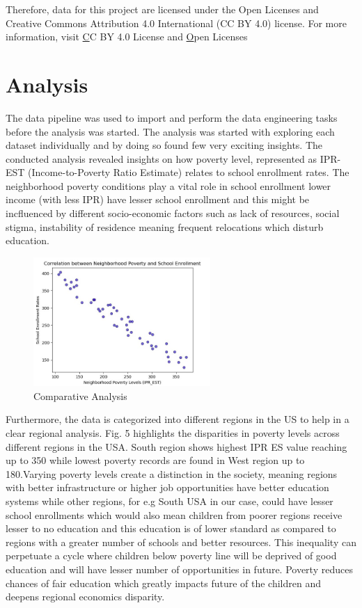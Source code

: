 \documentclass[a4paper,11pt]{article}
\begin{document}
    Therefore, data for this project are licensed under the Open Licenses and Creative Commons Attribution 4.0 International (CC BY 4.0) license. For more information, visit \href{https://creativecommons.org/licenses/by/4.0/}CC BY 4.0 License and \href{https://resources.data.gov/open-licenses/}Open Licenses

\vspace{0.2cm}

\section{Analysis}

The data pipeline was used to import and perform the data engineering tasks before the analysis was started. The analysis was started with exploring each dataset individually and by doing so found few very exciting insights. The conducted analysis revealed insights on how poverty level, represented as IPR-EST (Income-to-Poverty Ratio Estimate) relates to school enrollment rates. The neighborhood poverty conditions play a vital role in school enrollment lower income (with less IPR) have lesser school enrollment and this might be incfluenced by different socio-economic factors such as lack of resources, social stigma, instability of residence meaning frequent relocations which disturb education.

\begin{figure}[ht!]
    \centering
    \includegraphics[width=0.6\textwidth]{images/Comparitive-Analysis.png}
    \caption{Comparative Analysis}
    \label{fig:temp_change}
\end{figure}

Furthermore, the data is categorized into different regions in the US to help in a clear regional analysis. Fig. 5 highlights the disparities in poverty levels across different regions in the USA. South region shows highest IPR ES value reaching up to 350 while lowest poverty records are found in West region up to 180.Varying poverty levels create a distinction in the society, meaning regions with better infrastructure or higher job opportunities have better education systems while other regions, for e.g South USA in our case, could have lesser school enrollments which would also mean children from poorer regions receive lesser to no education and this education is of lower standard as compared to regions with a greater number of schools and better resources.
This inequality can perpetuate a cycle where children below poverty line will be deprived of good education and will have lesser number of opportunities in future. Poverty reduces chances of fair education which greatly impacts future of the children and deepens regional economics disparity. 
\end{document}
